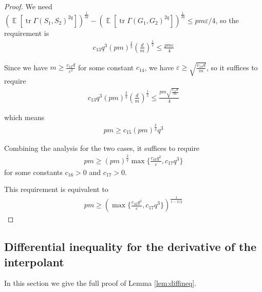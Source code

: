 \documentclass[11pt]{amsart}
\numberwithin{equation}{section}
\numberwithin{equation}{section}
\DeclareMathOperator{\E}{\mathbb{E}}
\DeclareMathOperator*{\tr}{tr}
\theoremstyle{remark}
\theoremstyle{definition}
\begin{document}
\begin{proof}
We need $(\E[\tr \Gamma(S_1,S_2)^{2q}])^{\frac{1}{2q}}-(\E[\tr \Gamma(G_1,G_2)^{2q}])^{\frac{1}{2q}} \le pm \varepsilon/4$, so the requirement is
\begin{align*}
    c_{13} q^3 (pm)^{\frac{2}{q}}(\frac{d}{m})^{\frac{1}{2}} \le \frac{pm \varepsilon}{4}
\end{align*}

Since we have $m \ge \frac{c_{14}d}{\varepsilon^2}$ for some constant $c_{14}$, we have $\varepsilon \ge \sqrt{\frac{c_{14}d}{m}}$, so it suffices to require
\begin{align*}
    c_{13} q^3 (pm)^{\frac{2}{q}}(\frac{d}{m})^{\frac{1}{2}} \le \frac{pm \sqrt{\frac{c_{14}d}{m}}}{4}
\end{align*}

which means
\begin{align*}
    pm \ge c_{15} (pm)^{\frac{2}{q}} {q^3}
\end{align*}

Combining the analysis for the two cases, it suffices to require
\begin{align*}pm \ge (pm)^{\frac{2}{q}}\max\{\frac{c_{16} q^{2}}{\varepsilon}, c_{17} q^3\}
\end{align*}
for some constants $c_{16}>0$ and $c_{17}>0$.

This requirement is equivalent to
\begin{align*}pm \ge (\max\{\frac{c_{16} q^{2}}{\varepsilon}, c_{17} q^3\})^{\frac{1}{1-2/q}}
\end{align*}

\end{proof}

\subsection{Differential inequality for the derivative of the interpolant}\label{subsec:diffineq}
In this section we give the full proof of Lemma \ref{lem:diffineq}.
\end{document}

